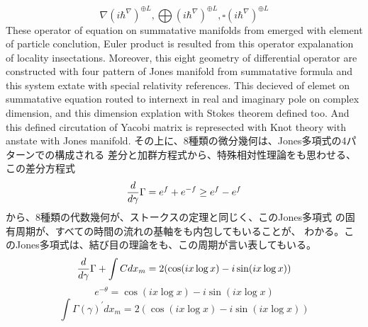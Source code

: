 \documentclass{jsarticle}
\begin{document}
   $$ \nabla ({i \hbar^{\nabla}})^{\oplus L}, \bigoplus ({i \hbar^{\nabla}})^{
	   \oplus L}, \square ({i \hbar^{\nabla}})^{\oplus L} $$
   These operator of equation on summatative manifolds from emerged with
   element of particle conclution, Euler product is resulted from this
   operator expalanation of locality insectations.
      Moreover, this eight geometry of differential operator are
   constructed with four pattern of Jones manifold from
   summatative formula and this system extate with special relativity
   references. This decieved of elemet on summatative equation routed
   to internext in real and imaginary pole on complex dimension,
   and this dimension explation with Stokes theorem defined too.
   And this defined circutation of Yacobi matrix is represected with
   Knot theory with anstate with Jones manifold.
   その上に、8種類の微分幾何は、Jones多項式の4パターンでの構成される
   差分と加群方程式から、特殊相対性理論をも思わせる、この差分方程式
   $$ {d \over d \gamma}\Gamma = e^{f} + e^{-f} \ge e^{f} - e^{f} $$
   から、8種類の代数幾何が、ストークスの定理と同じく、このJones多項式
   の固有周期が、すべての時間の流れの基軸をも内包してもいることが、
   わかる。このJones多項式は、結び目の理論をも、この周期が言い表してもいる。
   $$ {d \over d \gamma}\Gamma + \int C dx_m = 2(\cos(i x \log x) - i \sin
   (i x \log x)) $$
    $$ e^{- \theta} = \cos(i x \log x) - i \sin(i x \log x)$$
    $$ \int \Gamma(\gamma)^{'}dx_m = 2(\cos (i x \log x) 
    - i \sin(i x \log x)) $$
\end{document}
